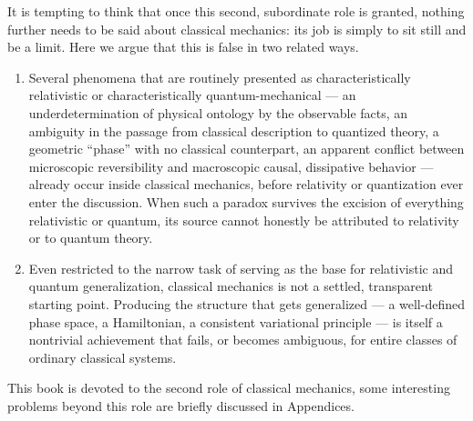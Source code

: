 It is tempting to think that once this second, subordinate role is granted, nothing
further needs to be said about classical mechanics: its job is simply to sit still
and be a limit. Here we argue that this is false in two related ways.
\begin{enumerate}
\item Several phenomena that are routinely presented as characteristically
relativistic or characteristically quantum-mechanical --- an underdetermination
of physical ontology by the observable facts, an ambiguity in the passage from
classical description to quantized theory, a geometric ``phase'' with no
classical counterpart, an apparent conflict between microscopic reversibility
and macroscopic causal, dissipative behavior --- already occur inside classical
mechanics, before relativity or quantization ever enter the discussion. When
such a paradox survives the excision of everything relativistic or quantum, its
source cannot honestly be attributed to relativity or to quantum theory.
\item Even restricted to the narrow task of serving as the base for
relativistic and quantum generalization, classical mechanics is not a settled,
transparent starting point. Producing the structure that gets generalized --- a
well-defined phase space, a Hamiltonian, a consistent variational principle ---
is itself a nontrivial achievement that fails, or becomes ambiguous, for entire
classes of ordinary classical systems.
\end{enumerate}

This book is devoted to the second role of classical mechanics, some
interesting problems beyond this role are briefly discussed in Appendices.

